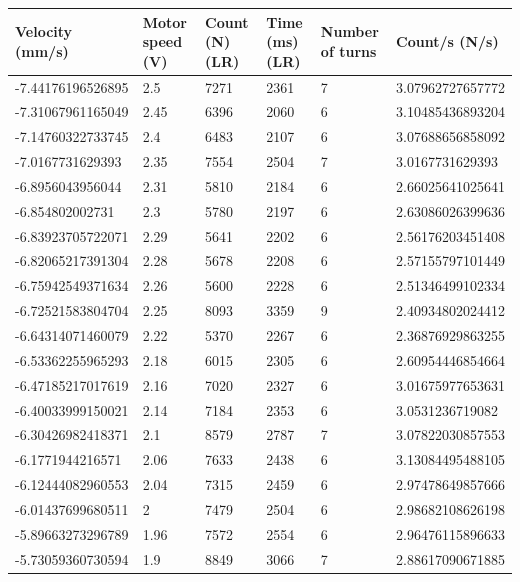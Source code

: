 \documentclass[a4paper]{report}
\numberwithin{equation}{section}
\begin{document}
\begin{table}[!ht]
    \centering
    \begin{tabular}{|l|l|l|l|l|l|}
    \hline
        Velocity (mm/s) & Motor speed (V) & Count (N) (LR) & Time (ms) (LR) & Number of turns & Count/s (N/s)\\ \hline
        -7.44176196526895 & 2.5 & 7271 & 2361 & 7 & 3.07962727657772 \\ \hline
        -7.31067961165049 & 2.45 & 6396 & 2060 & 6 & 3.10485436893204 \\ \hline
        -7.14760322733745 & 2.4 & 6483 & 2107 & 6 & 3.07688656858092 \\ \hline
        -7.0167731629393 & 2.35 & 7554 & 2504 & 7 & 3.0167731629393 \\ \hline
        -6.8956043956044 & 2.31 & 5810 & 2184 & 6 & 2.66025641025641 \\ \hline
        -6.854802002731 & 2.3 & 5780 & 2197 & 6 & 2.63086026399636 \\ \hline
        -6.83923705722071 & 2.29 & 5641 & 2202 & 6 & 2.56176203451408 \\ \hline
        -6.82065217391304 & 2.28 & 5678 & 2208 & 6 & 2.57155797101449 \\ \hline
        -6.75942549371634 & 2.26 & 5600 & 2228 & 6 & 2.51346499102334 \\ \hline
        -6.72521583804704 & 2.25 & 8093 & 3359 & 9 & 2.40934802024412 \\ \hline
        -6.64314071460079 & 2.22 & 5370 & 2267 & 6 & 2.36876929863255 \\ \hline
        -6.53362255965293 & 2.18 & 6015 & 2305 & 6 & 2.60954446854664 \\ \hline
        -6.47185217017619 & 2.16 & 7020 & 2327 & 6 & 3.01675977653631 \\ \hline
        -6.40033999150021 & 2.14 & 7184 & 2353 & 6 & 3.0531236719082 \\ \hline
        -6.30426982418371 & 2.1 & 8579 & 2787 & 7 & 3.07822030857553 \\ \hline
        -6.1771944216571 & 2.06 & 7633 & 2438 & 6 & 3.13084495488105 \\ \hline
        -6.12444082960553 & 2.04 & 7315 & 2459 & 6 & 2.97478649857666 \\ \hline
        -6.01437699680511 & 2 & 7479 & 2504 & 6 & 2.98682108626198 \\ \hline
        -5.89663273296789 & 1.96 & 7572 & 2554 & 6 & 2.96476115896633 \\ \hline
        -5.73059360730594 & 1.9 & 8849 & 3066 & 7 & 2.88617090671885 \\ \hline

\end{tabular}
\end{table}
\end{document}
